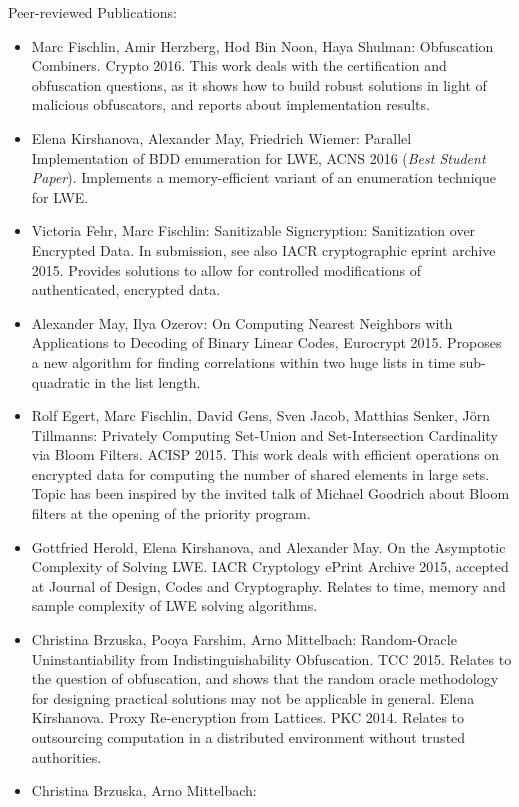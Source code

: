 \noindent
Peer-reviewed Publications:
\begin{itemize}
 \item   Marc Fischlin, Amir Herzberg, Hod Bin Noon, Haya Shulman:
Obfuscation Combiners. Crypto 2016. This work deals with the certification and obfuscation questions, as it shows how to build robust solutions in light of malicious obfuscators, and reports about implementation results.
%
\item Elena Kirshanova, Alexander May, Friedrich Wiemer: Parallel Implementation of BDD enumeration for LWE, ACNS 2016 ({\em Best Student Paper}). Implements a memory-efficient variant of an enumeration technique for LWE.
%
\item 
Victoria Fehr, Marc Fischlin:
Sanitizable Signcryption: Sanitization over Encrypted Data. In submission, see also IACR cryptographic eprint archive 2015. Provides solutions to allow for controlled modifications of authenticated, encrypted data.
%
\item Alexander May, Ilya Ozerov: On Computing Nearest Neighbors with Applications to Decoding of Binary Linear Codes, Eurocrypt 2015. Proposes a new algorithm for finding correlations within two huge lists in time sub-quadratic in the list length.  
%
\item Rolf Egert, Marc Fischlin, David Gens, Sven Jacob, Matthias Senker, J\"orn Tillmanns: Privately Computing Set-Union and Set-Intersection Cardinality via Bloom Filters. ACISP 2015. This work deals with efficient operations on encrypted data for computing the number of shared elements in large sets. Topic has been inspired by the invited talk of Michael Goodrich about Bloom filters at the opening of the priority program.
%
\item Gottfried Herold, Elena Kirshanova, and Alexander May. On the Asymptotic Complexity of Solving LWE. IACR Cryptology ePrint Archive 2015, accepted at Journal of Design, Codes and Cryptography. Relates to time, memory and sample complexity of LWE solving algorithms.
%
\item Christina Brzuska, Pooya Farshim, Arno Mittelbach:
Random-Oracle Uninstantiability from Indistinguishability Obfuscation. TCC 2015. Relates to the question of obfuscation, and shows that the random oracle methodology for designing practical solutions may not be applicable in general.
%
Elena Kirshanova. Proxy Re-encryption from Lattices.  PKC 2014. Relates to outsourcing computation in a distributed environment without trusted authorities.
%
\item Christina Brzuska, Arno Mittelbach:

\end{itemize}
